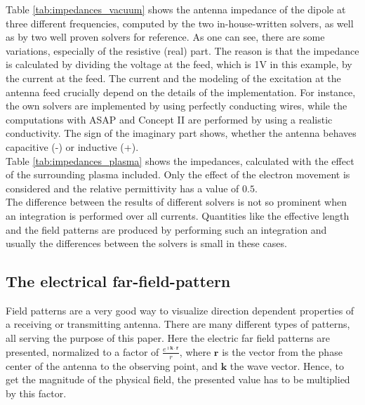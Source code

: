 \documentclass[a4paper,11pt]{article}
\begin{document}
Table \ref{tab:impedances_vacuum} shows the antenna impedance of the dipole at three different frequencies, computed by the two in-house-written solvers, as well as by two well proven solvers for reference. As one can see, there are some variations, especially of the resistive (real) part. The reason is that the impedance is calculated by dividing the voltage at the feed, which is 1V in this example, by the current at the feed. The current and the modeling of the excitation at the antenna feed crucially depend on the details of the implementation. For instance, the own solvers are implemented by using perfectly conducting wires, while the computations with ASAP and Concept II are performed by using a realistic conductivity. The sign of the imaginary part shows, whether the antenna behaves capacitive (-) or inductive (+).\\

Table \ref{tab:impedances_plasma} shows the impedances, calculated with the effect of the surrounding plasma included. Only the effect of the electron movement is considered and the relative permittivity has a value of $0.5$.\\

The difference between the results of different solvers is not so prominent when an integration is performed over all currents. Quantities like the effective length and the field patterns are produced by performing such an integration and usually the differences between the solvers is small in these cases.\\


\subsection{The electrical far-field-pattern}
Field patterns are a very good way to visualize direction dependent properties of a receiving or transmitting antenna. There are many different types of patterns, all serving the purpose of this paper. Here the electric far field patterns are presented, normalized to a factor of $\frac{e^{\imath \mathbf{k}\cdot \mathbf{r}}}{r}$, where $\mathbf{r}$ is the vector from the phase center of the antenna to the observing point, and $\mathbf{k}$ the wave vector. Hence, to get the magnitude of the physical field, the presented value has to be multiplied by this factor.\\
\end{document}
